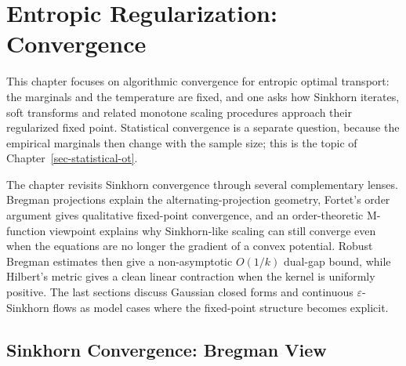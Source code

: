 
\chapter{Entropic Regularization: Convergence}
\label{sec-sinkhorn-advanced}
\label{sec-entropic-convergence}
\label{sec-convergence-dual}

This chapter focuses on algorithmic convergence for entropic optimal transport: the marginals and the temperature are fixed, and one asks how Sinkhorn iterates, soft transforms and related monotone scaling procedures approach their regularized fixed point.  Statistical convergence is a separate question, because the empirical marginals then change with the sample size; this is the topic of Chapter~\ref{sec-statistical-ot}.

The chapter revisits Sinkhorn convergence through several complementary lenses. Bregman projections explain the alternating-projection geometry, Fortet's order argument gives qualitative fixed-point convergence, and an order-theoretic M-function viewpoint explains why Sinkhorn-like scaling can still converge even when the equations are no longer the gradient of a convex potential. Robust Bregman estimates then give a non-asymptotic $O(1/k)$ dual-gap bound, while Hilbert's metric gives a clean linear contraction when the kernel is uniformly positive. The last sections discuss Gaussian closed forms and continuous \(\varepsilon\)-Sinkhorn flows as model cases where the fixed-point structure becomes explicit.

\section{Sinkhorn Convergence: Bregman View}
\label{sec-convergence-init}

